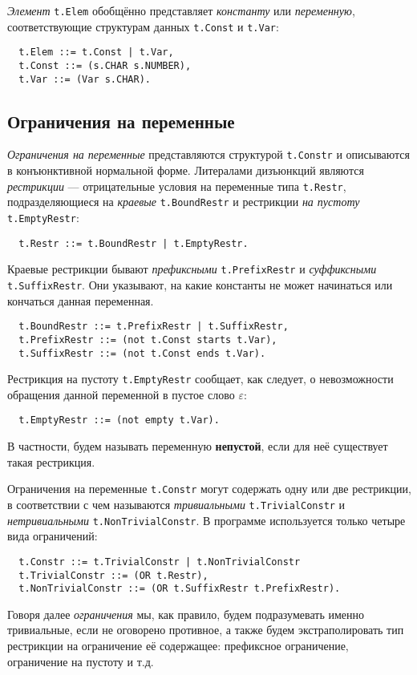 \documentclass[12pt]{article}
\begin{document}
\textit{Элемент} \texttt{t.Elem} обобщённо представляет \textit{константу} или
\textit{переменную}, соответствующие структурам данных \texttt{t.Const} и
\texttt{t.Var}:
\begin{Verbatim}
  t.Elem ::= t.Const | t.Var,
  t.Const ::= (s.CHAR s.NUMBER),
  t.Var ::= (Var s.CHAR).
\end{Verbatim}


\subsection{Ограничения на переменные}

\textit{Ограничения на переменные} представляются структурой \texttt{t.Constr}
и описываются в конъюнктивной нормальной форме. Литералами дизъюнкций являются
\textit{рестрикции} --- отрицательные условия на переменные типа
\texttt{t.Restr}, подразделяющиеся на \textit{краевые} \texttt{t.BoundRestr} и
рестрикции \textit{на пустоту} \\ \texttt{t.EmptyRestr}:
\begin{Verbatim}
  t.Restr ::= t.BoundRestr | t.EmptyRestr.
\end{Verbatim}
Краевые рестрикции бывают \textit{префиксными} \texttt{t.PrefixRestr} и
\textit{суффиксными} \texttt{t.SuffixRestr}. Они указывают, на какие константы
не может начинаться или кончаться данная переменная.
\begin{Verbatim}
  t.BoundRestr ::= t.PrefixRestr | t.SuffixRestr,
  t.PrefixRestr ::= (not t.Const starts t.Var),
  t.SuffixRestr ::= (not t.Const ends t.Var).
\end{Verbatim}
Рестрикция на пустоту \texttt{t.EmptyRestr} сообщает, как следует, о
невозможности обращения данной переменной в пустое слово $\varepsilon$:
\begin{Verbatim}
  t.EmptyRestr ::= (not empty t.Var).
\end{Verbatim}
В частности, будем называть переменную \textbf{непустой}, если для неё
существует такая рестрикция.

Ограничения на переменные \texttt{t.Constr} могут содержать одну или две
рестрикции, в соответствии с чем называются \textit{тривиальными}
\texttt{t.TrivialConstr} и \textit{нетривиальными} \texttt{t.NonTrivialConstr}.
В программе используется только четыре вида ограничений:
\begin{Verbatim}
  t.Constr ::= t.TrivialConstr | t.NonTrivialConstr
  t.TrivialConstr ::= (OR t.Restr),
  t.NonTrivialConstr ::= (OR t.SuffixRestr t.PrefixRestr).
\end{Verbatim}
Говоря далее \textit{ограничения} мы, как правило, будем подразумевать именно
тривиальные, если не оговорено противное, а также будем экстраполировать
тип рестрикции на ограничение её содержащее: префиксное ограничение,
ограничение на пустоту и т.д.
\end{document}
